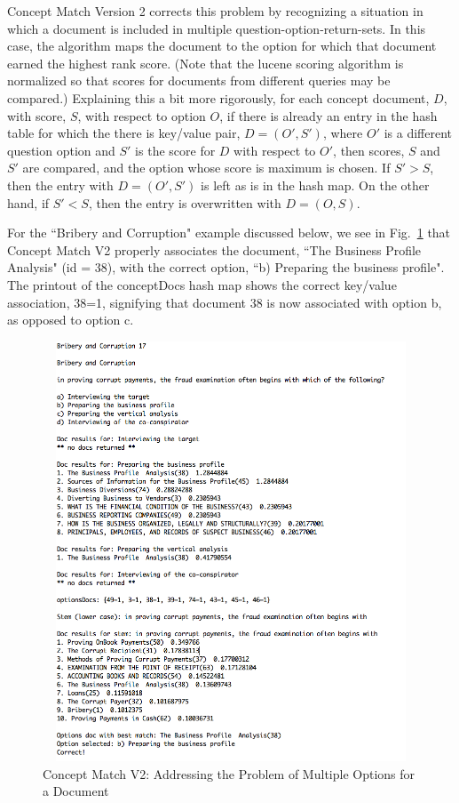 Concept Match Version 2 corrects this problem by recognizing a situation in which a document is included in multiple question-option-return-sets.  In this case, the algorithm maps the document to the option for which that document earned the highest rank score.  (Note that the lucene scoring algorithm is normalized so that scores for documents from different queries may be compared.)  Explaining this a bit more rigorously, for each concept document, $D$, with score, $S$, with respect to option $O$, if there is already an entry in the hash table for which the there is key/value pair, $D=(O',S')$, where $O'$ is a different question option and $S'$ is the score for $D$ with respect to $O'$, then scores, $S$ and $S'$ are compared, and the option whose score is maximum is chosen. If $S' > S$, then the entry with $D = (O',S')$ is left as is in the hash map. On the other hand, if $S' < S$, then the entry is overwritten with $D = (O,S)$.

For the ``Bribery and Corruption" example discussed below, we see in Fig.~\ref{fig:concept_match_v2_multiple_concept_docs} that Concept Match V2 properly associates the document, ``The Business Profile Analysis" (id = 38), with the correct option, ``b) Preparing the business profile".  The printout of the conceptDocs hash map shows the correct key/value association, 38=1, signifying that document 38 is now associated with option b, as opposed to option c.


\begin{figure}
\centering
\vspace{1.0in}
\includegraphics[width=125mm, height=125mm]{concept_match_v2_multiple_concept_docs.png}
\caption{Concept Match V2: Addressing the Problem of Multiple Options for a Document}
\label{fig:concept_match_v2_multiple_concept_docs}
\end{figure}

